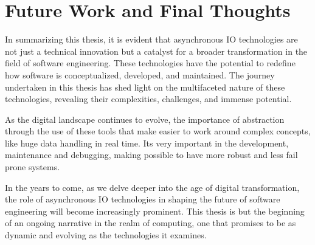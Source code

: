 \section{Future Work and Final Thoughts}
In summarizing this thesis, it is evident that asynchronous IO technologies are not just a technical innovation but a catalyst for a broader transformation in the field of software engineering. These technologies have the potential to redefine how software is conceptualized, developed, and maintained. The journey undertaken in this thesis has shed light on the multifaceted nature of these technologies, revealing their complexities, challenges, and immense potential.

As the digital landscape continues to evolve, the importance of abstraction through the use of these tools that make easier to work around complex concepts, like huge data handling in real time. Its very important in the development, maintenance and debugging, making possible to have more robust and less fail prone systems.

In the years to come, as we delve deeper into the age of digital transformation, the role of asynchronous IO technologies in shaping the future of software engineering will become increasingly prominent. This thesis is but the beginning of an ongoing narrative in the realm of computing, one that promises to be as dynamic and evolving as the technologies it examines.


